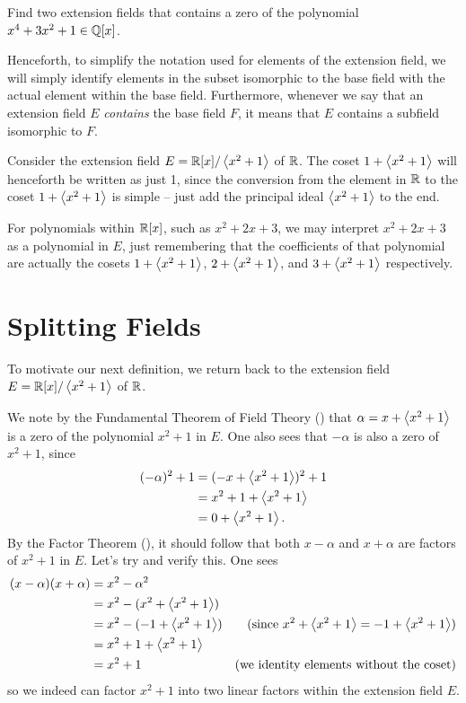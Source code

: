 \begin{exercise}
    Find two extension fields that contains a zero of the polynomial $x^4 + 3x^2 + 1 \in \mathbb{Q}[x]$.
\end{exercise}

Henceforth, to simplify the notation used for elements of the extension field, we will simply identify elements in the subset isomorphic to the base field with the actual element within the base field. Furthermore, whenever we say that an extension field $E$ \textit{contains} the base field $F$, it means that $E$ contains a subfield isomorphic to $F$.

\begin{example}
    Consider the extension field $E = \mathbb{R}[x]/\left\langle x^2+1\right\rangle$ of $\mathbb{R}$. The coset $1 + \left\langle x^2+1\right\rangle$ will henceforth be written as just 1, since the conversion from the element in $\mathbb{R}$ to the coset $1 + \left\langle x^2+1\right\rangle$ is simple -- just add the principal ideal $\left\langle x^2+1\right\rangle$ to the end.

    For polynomials within $\mathbb{R}[x]$, such as $x^2 + 2x + 3$, we may interpret $x^2 + 2x + 3$ as a polynomial in $E$, just remembering that the coefficients of that polynomial are actually the cosets $1 + \left\langle x^2+1\right\rangle$, $2 + \left\langle x^2+1\right\rangle$, and $3 + \left\langle x^2+1\right\rangle$ respectively.
\end{example}

\section{Splitting Fields}
To motivate our next definition, we return back to the extension field $E = \mathbb{R}[x]/\left\langle x^2+1\right\rangle$ of $\mathbb{R}$.
\begin{example}
    We note by the Fundamental Theorem of Field Theory () that $\alpha = x + \left\langle x^2+1\right\rangle$ is a zero of the polynomial $x^2+1$ in $E$. One also sees that $-\alpha$ is also a zero of $x^2+1$, since
    \begin{align*}
        (-\alpha)^2 + 1 &= (-x + \left\langle x^2+1\right\rangle)^2 + 1\\
        &= x^2 + 1 + \left\langle x^2+1\right\rangle\\
        &= 0 + \left\langle x^2+1\right\rangle.
    \end{align*}
    By the Factor Theorem (), it should follow that both $x - \alpha$ and $x + \alpha$ are factors of $x^2 + 1$ in $E$. Let's try and verify this. One sees
    \begin{align*}
        (x-\alpha)(x+\alpha) &= x^2 - \alpha^2\\
        &= x^2 - (x^2 + \left\langle x^2+1\right\rangle)\\
        &= x^2 - (-1 + \left\langle x^2+1\right\rangle) & (\text{since } x^2 + \left\langle x^2+1\right\rangle = -1 + \left\langle x^2+1\right\rangle)\\
        &= x^2 + 1 + \left\langle x^2+1\right\rangle\\
        &= x^2 + 1 & (\text{we identity elements without the coset})
    \end{align*}
    so we indeed can factor $x^2 + 1$ into two linear factors within the extension field $E$.
\end{example}


